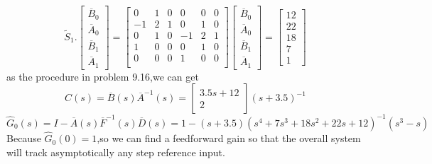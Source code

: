 \documentclass{article}
\begin{document}
\[
\tilde{S}_1.\left[
    \begin{array}{c}
        \overline{B}_0\\
        \overline{A}_0\\
        \overline{B}_1\\
        \overline{A}_1
    \end{array}
\right]=\left[
    \begin{array}{cccccc}
            0 & 1 & 0 & 0 & 0 & 0\\
            -1 & 2 & 1 & 0 & 1 & 0\\
            0 & 1 & 0 & -1 & 2 & 1\\
            1 & 0 & 0 & 0 & 1 & 0\\
            0 & 0 & 0 & 1 & 0 & 0\\
    \end{array}
\right]
\left[
    \begin{array}{c}
        \overline{B}_0\\
        \overline{A}_0\\
        \overline{B}_1\\
        \overline{A}_1
    \end{array}
\right]=
\left[
    \begin{array}{c}
        12\\
        22\\
        18\\
        7\\
        1
    \end{array}
\right]
\]
as the procedure in problem 9.16,we can get
\[
C(s)=\overline{B}(s)\overline{A}^{-1}(s)=
\left[
    \begin{array}{c}
        3.5s+12\\
        2
    \end{array}
\right](s+3.5)^{-1}
\]
\[\hat{G}_0(s)=I-\overline{A}(s)\overline{F}^{-1}(s)\overline{D}(s)=1-(s+3.5)(s^4+7s^3+18s^2+22s+12)^{-1}(s^3-s)\]
Because $\hat{G}_0(0)=1$,so we can find a feedforward gain so that the overall system will track asymptotically any step reference input.
\end{document}
